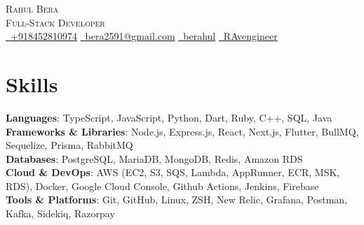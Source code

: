 \documentclass[a4paper,11pt]{article}
\begin{document}
\begin{center}
    {\Huge \scshape Rahul Bera} \\ \vspace{1pt}
    {\large \scshape Full-Stack Developer} \\ \vspace{1pt}
    \small \href{tel:+918452810974}{\faPhone\ +918452810974} \quad \href{mailto:bera2591@gmail.com}{\faEnvelope\ bera2591@gmail.com} \quad \href{https://www.linkedin.com/in/berahul/}{\faLinkedin\ berahul} \quad \href{https://github.com/RAvengineer}{\faGithub\ RAvengineer} \quad {}
\end{center}


\section{Skills}
 \begin{itemize}[leftmargin=0.15in, label={}]
    \small{\item{
     \textbf{Languages}{: TypeScript, JavaScript, Python, Dart, Ruby, C++, SQL, Java} \\
     \textbf{Frameworks \& Libraries}{: Node.js, Express.js, React, Next.js, Flutter, BullMQ, Sequelize, Prisma, RabbitMQ} \\
     \textbf{Databases}{: PostgreSQL, MariaDB, MongoDB, Redis, Amazon RDS} \\
     \textbf{Cloud \& DevOps}{: AWS (EC2, S3, SQS, Lambda, AppRunner, ECR, MSK, RDS), Docker, Google Cloud Console, Github Actions, Jenkins, Firebase} \\
     \textbf{Tools \& Platforms}{: Git, GitHub, Linux, ZSH, New Relic, Grafana, Postman, Kafka, Sidekiq, Razorpay}
    }}
 \end{itemize}


\end{document}
